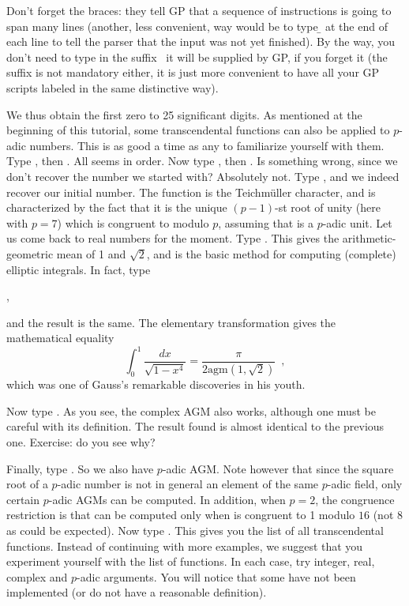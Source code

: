 Don't forget the braces: they tell GP that a sequence of instructions is going
to span many lines (another, less convenient, way would be to type \b{} at the
end of each line to tell the parser that the input was not yet finished).
By the way, you don't need to type in the suffix~ it will be
supplied by GP, if you forget it (the suffix is not mandatory either, it is
just more convenient to have all your GP scripts labeled in the same
distinctive way).

We thus obtain the first zero to 25 significant digits.
\medskip
%
As mentioned at the beginning of this tutorial, some transcendental functions
can also be applied to $p$-adic numbers. This is as good a time as any to
familiarize yourself with them. Type , then
. All seems in order. Now type ,
then . Is something wrong, since we don't recover the number we
started with? Absolutely not. Type
 ,
and we indeed recover our initial number. The function 
is the Teichm\"uller character, and is characterized by the fact that it is
the unique \hbox{$(p-1)$-st} root of unity (here with $p=7$) which is
congruent to  modulo $p$, assuming that  is a $p$-adic
unit.\smallskip
%
Let us come back to real numbers for the moment. Type .
This gives the arithmetic-geometric mean of 1 and $\sqrt2$, and is the basic
method for computing (complete) elliptic integrals. In fact, type

,

\noindent and the result is the same. The elementary transformation
 gives the mathematical equality
$$\int_0^1 \dfrac{dx}{\sqrt{1-x^4}} = \dfrac{\pi}{2\text{agm}(1,\sqrt2)}
\enspace,$$
which was one of Gauss's remarkable discoveries in his youth.

Now type . As you see, the complex AGM also works,
although one must be careful with its definition. The result found is
almost identical to the previous one. Exercise: do you see why?

Finally, type . So we also have $p$-adic
AGM. Note however that since the square root of a $p$-adic number is not
in general an element of the same $p$-adic field,
only certain $p$-adic AGMs can be computed. In addition,
when $p=2$, the congruence restriction is that  can be computed
only when  is congruent to 1 modulo $16$ (not 8 as could be
expected).\smallskip
%
Now type . This gives you the list of all transcendental functions.
Instead of continuing with more examples, we suggest that you experiment
yourself with the list of functions. In each case, try integer, real, complex
and $p$-adic arguments. You will notice that some have not been implemented
(or do not have a reasonable definition).

